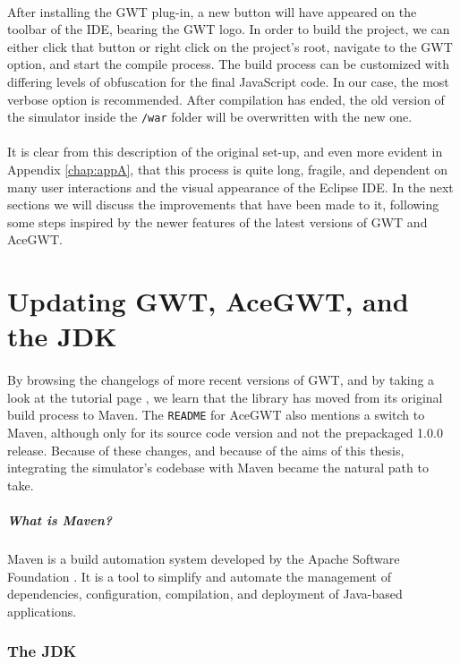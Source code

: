 \paragraph{}
After installing the GWT plug-in, a new button will have appeared on the toolbar of the IDE, bearing the GWT logo. In order to build the project, we can either click that button or right click on the project's root, navigate to the GWT option, and start the compile process. The build process can be customized with differing levels of obfuscation for the final JavaScript code. In our case, the most verbose option is recommended. After compilation has ended, the old version of the simulator inside the \verb|/war| folder will be overwritten with the new one.
\paragraph{}
It is clear from this description of the original set-up, and  even more evident in Appendix \ref{chap:appA}, that this process is quite long, fragile, and dependent on many user interactions and the visual appearance of the Eclipse IDE. In the next sections we will discuss the improvements that have been made to it, following some steps inspired by the newer features of the latest versions of GWT and AceGWT.
\section{Updating GWT, AceGWT, and the JDK}
\paragraph{}
By browsing the changelogs of more recent versions of GWT, and by taking a look at the tutorial page \cite{web:gwtnewtutorial}, we learn that the library has moved from its original build process to Maven. The \verb|README| for AceGWT also mentions a switch to Maven, although only for its source code version and not the prepackaged 1.0.0 release. Because of these changes, and because of the aims of this thesis, integrating the simulator's codebase with Maven became the natural path to take.
\subparagraph{What is Maven?}
Maven \cite{mavenweb} is a build automation system developed by the Apache Software Foundation \cite{web:apachefoundation}. It is a tool to simplify and automate the management of dependencies, configuration, compilation, and deployment of Java-based applications.
\subsubsection{The JDK}
